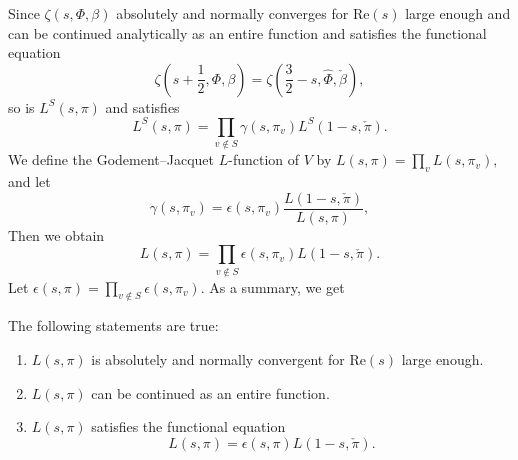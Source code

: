 Since $\zeta (s,\Phi,\beta )$ absolutely and normally converges for $\mathrm {Re} (s)$ large enough and can be continued analytically as an entire function and satisfies the functional equation 
\[
\zeta (s+\frac 1 2, \Phi, \beta) =\zeta (\frac 3 2-s ,\widehat \Phi ,\check \beta ),
\]
so is $L^S(s,\pi)$ and satisfies 
\[
L^S(s,\pi) = \prod \limits_{v\notin S}\gamma(s,\pi_v) L^S(1-s,\check \pi).
\]
We define the Godement--Jacquet $L$-function of $V$ by
$L(s,\pi)=\prod\limits_v L(s,\pi_v),$
and let 
\[ 
\gamma(s,\pi_v) =\epsilon (s,\pi_v) \frac {L(1-s, \check \pi )} {L(s,\pi)},
\]
Then we obtain 
\[
L(s,\pi) =\prod\limits_{v\notin S} \epsilon (s,\pi_v) L(1-s,\check \pi).
\]
Let $\epsilon (s,\pi) =\prod_{v\notin S} \epsilon (s,\pi_v)$. As a summary, we get 
\begin{theorem} The following statements are true:
\begin{enumerate}
\item $L(s,\pi )$ is absolutely and normally convergent for $\mathrm{Re} (s)$ large enough.
\item $L(s,\pi)$ can be continued as an entire function.
\item $L(s, \pi)$ satisfies the functional equation
\[ 
L(s,\pi) =\epsilon (s,\pi) L(1-s, \check \pi).
\]
\end{enumerate}
\end{theorem}
